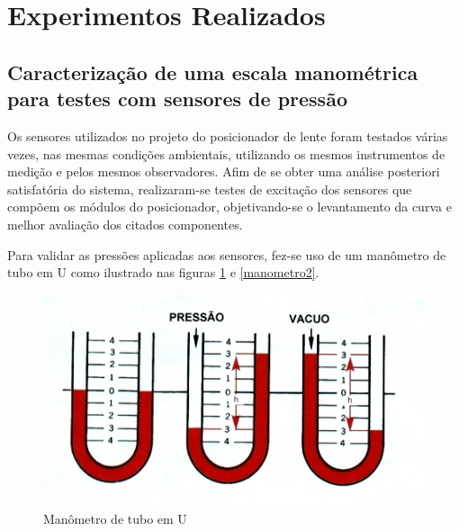 \section[Experimentos Realizados]{Experimentos Realizados}

\subsection[Caracterização de uma escala manométrica para testes com sensores de pressão]{Caracterização de uma escala manométrica para testes com sensores de pressão}

Os sensores utilizados no projeto do posicionador de lente foram testados várias vezes, nas mesmas condições ambientais, utilizando os mesmos instrumentos de medição e pelos mesmos observadores. Afim de se obter uma análise posteriori satisfatória do sistema, realizaram-se testes de excitação dos sensores que compõem os módulos do posicionador, objetivando-se o levantamento da curva e melhor avaliação dos citados componentes. 

Para validar as pressões aplicadas aos sensores, fez-se uso de um manômetro de tubo em U como ilustrado nas figuras \ref{manometro} e \ref{manometro2}.

\begin{figure}[H]
		\centering
			\includegraphics[scale=1.0]{figuras/manometro.png}
		\caption{Manômetro de tubo em U}
		\label{manometro}
\end{figure}


